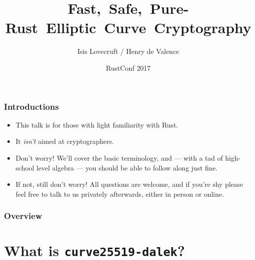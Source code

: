\documentclass[xetex,aspectratio=169]{beamer}
\title{\mbox{Fast, Safe, Pure-Rust Elliptic Curve Cryptography}}
\author{Isis Lovecruft / Henry de Valence}
\date{RustConf 2017}
\begin{document}
\maketitle

\begin{frame}
  \frametitle{Introductions}

  \begin{itemize}
    \item<2-> This talk is for those with light familiarity with Rust.
    \item<3-> It \emph{isn't} aimed at cryptographers.
    \item<4-> Don't worry! We'll cover the basic terminology, and --- with a tad
      of high-school level algebra --- you should be able to follow along just
      fine.
    \item<5-> If not, still don't worry! All questions are welcome, and if
      you're shy please feel free to talk to us privately afterwards, either in
      person or online.
  \end{itemize}
\end{frame}

\begin{frame}
  \frametitle{Overview}
  \tableofcontents
\end{frame}

\section{What is \texttt{curve25519-dalek}?}
\end{document}
